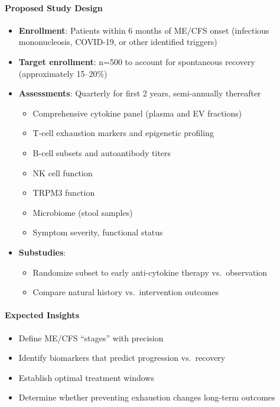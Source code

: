 \paragraph{Proposed Study Design}
\begin{itemize}
    \item \textbf{Enrollment}: Patients within 6 months of ME/CFS onset (infectious mononucleosis, COVID-19, or other identified triggers)
    \item \textbf{Target enrollment}: n=500 to account for spontaneous recovery (approximately 15--20\%)
    \item \textbf{Assessments}: Quarterly for first 2 years, semi-annually thereafter
    \begin{itemize}
        \item Comprehensive cytokine panel (plasma and EV fractions)
        \item T-cell exhaustion markers and epigenetic profiling
        \item B-cell subsets and autoantibody titers
        \item NK cell function
        \item TRPM3 function
        \item Microbiome (stool samples)
        \item Symptom severity, functional status
    \end{itemize}
    \item \textbf{Substudies}:
    \begin{itemize}
        \item Randomize subset to early anti-cytokine therapy vs.\ observation
        \item Compare natural history vs.\ intervention outcomes
    \end{itemize}
\end{itemize}

\paragraph{Expected Insights}
\begin{itemize}
    \item Define ME/CFS ``stages'' with precision
    \item Identify biomarkers that predict progression vs.\ recovery
    \item Establish optimal treatment windows
    \item Determine whether preventing exhaustion changes long-term outcomes
\end{itemize}

